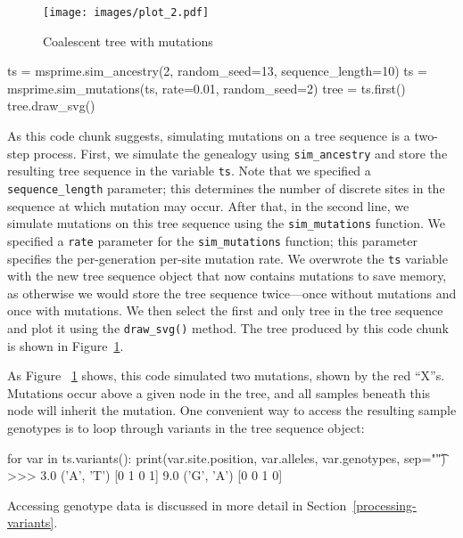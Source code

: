 \documentclass[graybox]{svmult}
\begin{document}
\begin{figure}[t]
\begin{center}
\texttt{[image: images/plot\_2.pdf]}
\end{center}
\caption{\label{fig-tree-mutations} Coalescent tree with mutations}
\end{figure}

\begin{pythoncode}
ts = msprime.sim_ancestry(2, random_seed=13, sequence_length=10)
ts = msprime.sim_mutations(ts, rate=0.01, random_seed=2)
tree = ts.first()
tree.draw_svg()
\end{pythoncode}

As this code chunk suggests, simulating mutations on a tree sequence is a two-step process.
First, we simulate the genealogy using \texttt{sim\_ancestry} and store the resulting
tree sequence in the variable \texttt{ts}. Note that we specified a \texttt{sequence\_length} parameter;
this determines the number of discrete sites in the sequence at which mutation
may occur. After that, in the second
line, we simulate mutations on this tree sequence using the \texttt{sim\_mutations} function.
We specified a \texttt{rate} parameter for the \texttt{sim\_mutations} function; this
parameter specifies the per-generation per-site mutation rate. We overwrote the \texttt{ts} variable
with the new tree sequence object that now contains mutations to save memory, as otherwise we would
store the tree sequence twice---once without mutations and once with mutations. We then
select the first and only tree in the tree sequence and plot it using the \texttt{draw\_svg()}
method. The tree produced by this code chunk is shown in Figure~\ref{fig-tree-mutations}.

As Figure ~\ref{fig-tree-mutations} shows, this code simulated two mutations,
shown by the red ``X''s.
Mutations occur above a given node in the tree, and all samples beneath
this node will inherit the mutation.
One convenient way to access the resulting sample genotypes is to loop through variants in the
tree sequence object:

\begin{pythoncode}
for var in ts.variants():
    print(var.site.position, var.alleles, var.genotypes, sep="\t")
>>> 3.0	('A', 'T')	[0 1 0 1]
    9.0	('G', 'A')	[0 0 1 0]
\end{pythoncode}
Accessing genotype data is discussed in more detail in Section~\ref{processing-variants}.
\end{document}
